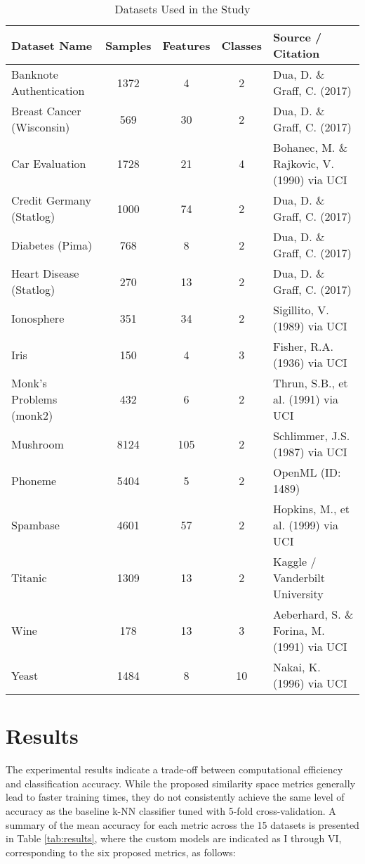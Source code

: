 \documentclass[conference]{IEEEtran}
\begin{document}
\begin{table*}[htbp]
\caption{Datasets Used in the Study}
\label{tab:datasets}
\begin{center}
\begin{tabular}{|l|c|c|c|l|}
\hline
\textbf{Dataset Name} & \textbf{Samples} & \textbf{Features} & \textbf{Classes} & \textbf{Source / Citation} \\
\hline
Banknote Authentication & 1372 & 4 & 2 & Dua, D. \& Graff, C. (2017) \cite{b53, b54} \\
Breast Cancer (Wisconsin) & 569 & 30 & 2 & Dua, D. \& Graff, C. (2017) \cite{b54, b55} \\
Car Evaluation & 1728 & 21 & 4 & Bohanec, M. \& Rajkovic, V. (1990) via UCI \cite{b54, b56} \\
Credit Germany (Statlog) & 1000 & 74 & 2 & Dua, D. \& Graff, C. (2017) \cite{b54, b57} \\
Diabetes (Pima) & 768 & 8 & 2 & Dua, D. \& Graff, C. (2017) \cite{b54, b58} \\
Heart Disease (Statlog) & 270 & 13 & 2 & Dua, D. \& Graff, C. (2017) \cite{b54, b59} \\
Ionosphere & 351 & 34 & 2 & Sigillito, V. (1989) via UCI \cite{b54, b60} \\
Iris & 150 & 4 & 3 & Fisher, R.A. (1936) via UCI \cite{b54, b61} \\
Monk's Problems (monk2) & 432 & 6 & 2 & Thrun, S.B., et al. (1991) via UCI \cite{b54, b62} \\
Mushroom & 8124 & 105 & 2 & Schlimmer, J.S. (1987) via UCI \cite{b54, b63} \\
Phoneme & 5404 & 5 & 2 & OpenML (ID: 1489) \cite{b64} \\
Spambase & 4601 & 57 & 2 & Hopkins, M., et al. (1999) via UCI \cite{b65, b66} \\
Titanic & 1309 & 13 & 2 & Kaggle / Vanderbilt University \cite{b67} \\
Wine & 178 & 13 & 3 & Aeberhard, S. \& Forina, M. (1991) via UCI \cite{b68, b69} \\
Yeast & 1484 & 8 & 10 & Nakai, K. (1996) via UCI \cite{b70, b71} \\
\hline
\end{tabular}
\end{center}
\end{table*}

\section{Results}
The experimental results indicate a trade-off between computational efficiency and classification accuracy. While the proposed similarity space metrics generally lead to faster training times, they do not consistently achieve the same level of accuracy as the baseline k-NN classifier tuned with 5-fold cross-validation. A summary of the mean accuracy for each metric across the 15 datasets is presented in Table \ref{tab:results}, where the custom models are indicated as I through VI, corresponding to the six proposed metrics, as follows:
\end{document}
